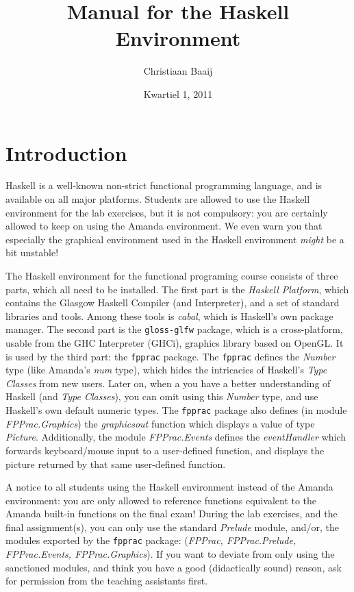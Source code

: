 \documentclass[]{article}
\title{Manual for the Haskell Environment}
\author{Christiaan Baaij}
\date{Kwartiel 1, 2011}
\begin{document}

\maketitle

\section{Introduction}
Haskell is a well-known non-strict functional programming language, and is available on all major platforms.
Students are allowed to use the Haskell environment for the lab exercises, but it is not compulsory: you are certainly allowed to keep on using the Amanda environment.
We even warn you that especially the graphical environment used in the Haskell environment \emph{might} be a bit unstable!

The Haskell environment for the functional programing course consists of three parts, which all need to be installed.
The first part is the \emph{Haskell Platform}, which contains the Glasgow Haskell Compiler (and Interpreter), and a set of standard libraries and tools. 
Among these tools is \emph{cabal}, which is Haskell's own package manager. The second part is the \texttt{gloss-glfw} package, which is a cross-platform, usable from the GHC Interpreter (GHCi), graphics library based on OpenGL.
It is used by the third part: the \texttt{fpprac} package. The \texttt{fpprac} defines the \emph{Number} type (like Amanda's \emph{num} type), which hides the intricacies of Haskell's \emph{Type Classes} from new users.
Later on, when a you have a better understanding of Haskell (and \emph{Type Classes}), you can omit using this \emph{Number} type, and use Haskell's own default numeric types.
The \texttt{fpprac} package also defines (in module \emph{FPPrac.Graphics}) the \emph{graphicsout} function which displays a value of type \emph{Picture}. Additionally, the module \emph{FPPrac.Events} defines the \emph{eventHandler} which forwards keyboard/mouse input to a user-defined function, and displays the picture returned by that same user-defined function.

A notice to all students using the Haskell environment instead of the Amanda environment: you are only allowed to reference functions equivalent to the Amanda built-in functions on the final exam! 
During the lab exercises, and the final assignment(s), you can only use the standard \emph{Prelude} module, and/or, the modules exported by the \texttt{fpprac} package: (\emph{FPPrac, FPPrac.Prelude, FPPrac.Events, FPPrac.Graphics}).
If you want to deviate from only using the sanctioned modules, and think you have a good (didactically sound) reason, ask for permission from the teaching assistants first.
\end{document}
